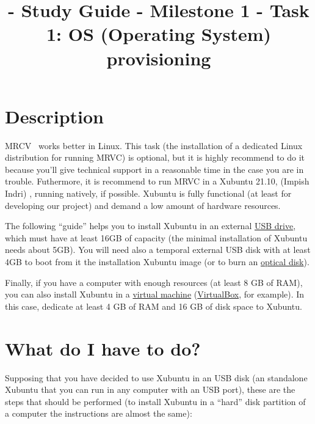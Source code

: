 
\title{\SM{} - Study Guide - Milestone 1 - Task 1: OS (Operating System) provisioning}

\maketitle

\tableofcontents

\section{Description}

MRCV~\cite{MRVC} works better in Linux.
This task (the installation of a dedicated Linux distribution for
running MRVC) is optional, but it is highly recommend to do it because
you'll give technical support in a reasonable time in the case you are
in trouble. Futhermore, it is recommend to run MRVC in a Xubuntu
21.10, (Impish Indri) \cite{xubuntu}, running natively,
if possible. Xubuntu is fully functional (at least for developing our
project) and demand a low amount of hardware resources.

The following ``guide'' helps you to install Xubuntu in an external
\href{https://en.wikipedia.org/wiki/USB_flash_drive}{USB drive}, which
must have at least 16GB of capacity (the minimal installation of
Xubuntu needs about 5GB). You will need also a temporal external USB
disk with at least 4GB to boot from it the installation Xubuntu image
(or to burn an
\href{https://en.wikipedia.org/wiki/Optical_disc}{optical disk}).

Finally, if you have a computer with enough resources (at least 8 GB
of RAM), you can also install Xubuntu in
a \href{https://en.wikipedia.org/wiki/Virtualization}{virtual machine}
(\href{https://www.virtualbox.org/}{VirtualBox}, for example). In this
case, dedicate at least 4 GB of RAM and 16 GB of disk space to
Xubuntu.

\section{What do I have to do?}

Supposing that you have decided to use Xubuntu in an USB disk (an
standalone Xubuntu that you can run in any computer with an USB port),
these are the steps that should be performed (to install Xubuntu in a
``hard'' disk partition of a computer the instructions are almost
the same):

